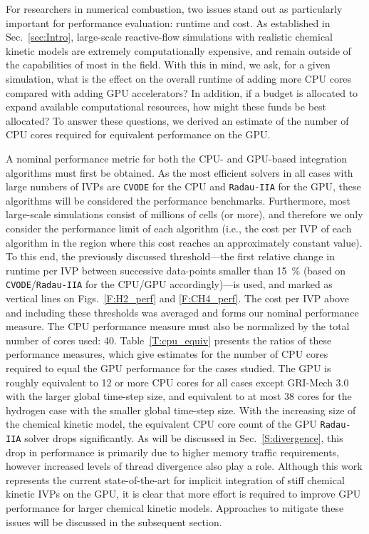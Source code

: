 \documentclass[preprint,review,11pt]{elsarticle}
\begin{document}
For researchers in numerical combustion, two issues stand out as particularly important for performance evaluation: runtime and cost.
As established in Sec.~\ref{sec:Intro}, large-scale reactive-flow simulations with realistic chemical kinetic models are extremely computationally expensive, and remain outside of the capabilities of most in the field.
With this in mind, we ask, for a given simulation, what is the effect on the overall runtime of adding more CPU cores compared with adding GPU accelerators?
In addition, if a budget is allocated to expand available computational resources, how might these funds be best allocated?
To answer these questions, we derived an estimate of the number of CPU cores required for equivalent performance on the GPU.

A nominal performance metric for both the CPU- and GPU-based integration algorithms must first be obtained.
As the most efficient solvers in all cases with large numbers of IVPs are \texttt{CVODE} for the CPU and \texttt{Radau-IIA} for the GPU, these algorithms will be considered the performance benchmarks.
Furthermore, most large-scale simulations consist of millions of cells (or more), and therefore we only consider the performance limit of each algorithm (i.e., the cost per IVP of each algorithm in the region where this cost reaches an approximately constant value).
To this end, the previously discussed threshold---the first relative change in runtime per IVP between successive data-points smaller than \SI{15}{\percent} (based on \texttt{CVODE}\slash\texttt{Radau-IIA} for the CPU\slash GPU accordingly)---is used, and marked as vertical lines on Figs.~\ref{F:H2_perf} and \ref{F:CH4_perf}.
The cost per IVP above and including these thresholds was averaged and forms our nominal performance measure.
The CPU performance measure must also be normalized by the total number of cores used: \num{40}.
Table~\ref{T:cpu_equiv} presents the ratios of these performance measures, which give estimates for the number of CPU cores required to equal the GPU performance for the cases studied.
The GPU is roughly equivalent to \num{12} or more CPU cores for all cases except GRI-Mech 3.0 with the larger global time-step size, and equivalent to at most \num{38} cores for the hydrogen case with the smaller global time-step size.
With the increasing size of the chemical kinetic model, the equivalent CPU core count of the GPU \texttt{Radau-IIA} solver drops significantly.
As will be discussed in Sec.~\ref{S:divergence}, this drop in performance is primarily due to higher memory traffic requirements, however increased levels of thread divergence also play a role.
Although this work represents the current state-of-the-art for implicit integration of stiff chemical kinetic IVPs on the GPU, it is clear that more effort is required to improve GPU performance for larger chemical kinetic models.
Approaches to mitigate these issues will be discussed in the subsequent section.
\end{document}
